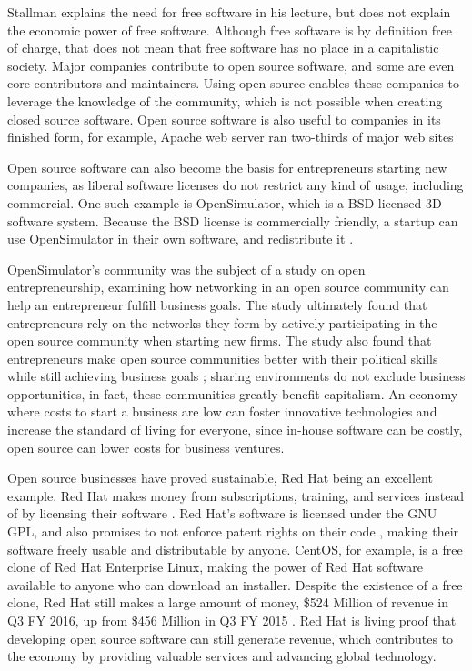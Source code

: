 Stallman \citeyear{rms2011} explains the need for free software in his lecture, but does not explain the economic power of free software.
Although free software is by definition free of charge, that does not mean that free software has no place in a capitalistic society.
Major companies contribute to open source software, and some are even core contributors and maintainers.
Using open source enables these companies to leverage the knowledge of the community, which is not possible when creating closed source software.
Open source software is also useful to companies in its finished form, for example, Apache web server ran two-thirds of major web sites \cite[p.~696]{powell}

Open source software can also become the basis for entrepreneurs starting new companies, as liberal software licenses do not restrict any kind of usage, including commercial.
One such example is OpenSimulator, which is a BSD licensed 3D software system.
Because the BSD license is commercially friendly, a startup can use OpenSimulator in their own software, and redistribute it \cite[p.~477-8]{yetis}.

OpenSimulator's community was the subject of a study on open entrepreneurship, examining how networking in an open source community can help an entrepreneur fulfill business goals.
The study ultimately found that entrepreneurs rely on the networks they form by actively participating in the open source community when starting new firms.
The study also found that entrepreneurs make open source communities better with their political skills while still achieving business goals \cite{yetis}; sharing environments do not exclude business opportunities, in fact, these communities greatly benefit capitalism.
An economy where costs to start a business are low can foster innovative technologies and increase the standard of living for everyone, since in-house software can be costly, open source can lower costs for business ventures.

Open source businesses have proved sustainable, Red Hat being an excellent example.
Red Hat makes money from subscriptions, training, and services instead of by licensing their software \cite[p.~31]{redhat}.
Red Hat's software is licensed under the GNU GPL, and also promises to not enforce patent rights on their code \cite[p.~65]{redhat}, making their software freely usable and distributable by anyone.
CentOS, for example, is a free clone of Red Hat Enterprise Linux, making the power of Red Hat software available to anyone who can download an installer.
Despite the existence of a free clone, Red Hat still makes a large amount of money, \$524 Million of revenue in Q3 FY 2016, up from \$456 Million in Q3 FY 2015 \cite[p.~24]{redhat}.
Red Hat is living proof that developing open source software can still generate revenue, which contributes to the economy by providing valuable services and advancing global technology.

